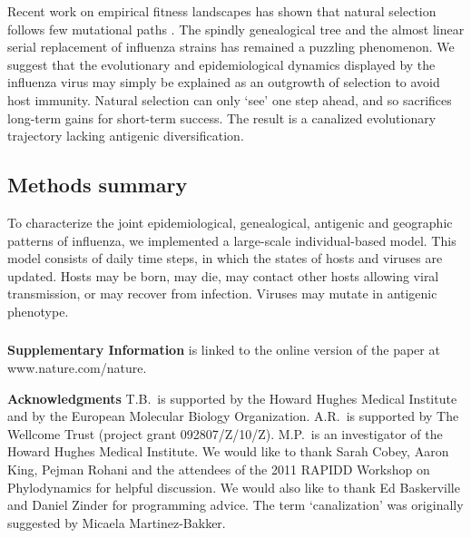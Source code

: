 Recent work on empirical fitness landscapes has shown that natural selection follows few mutational paths \cite{Weinreich06}.  The spindly genealogical tree and the almost linear serial replacement of influenza strains has remained a puzzling phenomenon.  We suggest that the evolutionary and epidemiological dynamics displayed by the influenza virus may simply be explained as an outgrowth of selection to avoid host immunity.  Natural selection can only `see' one step ahead, and so sacrifices long-term gains for short-term success.  The result is a canalized evolutionary trajectory lacking antigenic diversification.


\subsection*{Methods summary}

To characterize the joint epidemiological, genealogical, antigenic and geographic patterns of influenza, we implemented a large-scale individual-based model.  This model consists of daily time steps, in which the states of hosts and viruses are updated.  Hosts may be born, may die, may contact other hosts allowing viral transmission, or may recover from infection.  Viruses may mutate in antigenic phenotype.




\subsubsection*{}
\noindent \textbf{Supplementary Information} is linked to the online version of the paper at www.nature.com/nature.

\vspace{0.3cm}

\noindent \textbf{Acknowledgments} T.B.\ is supported by the Howard Hughes Medical Institute and by the European Molecular Biology Organization.  A.R.\ is supported by The Wellcome Trust (project grant 092807/Z/10/Z).  M.P.\ is an investigator of the Howard Hughes Medical Institute.  We would like to thank Sarah Cobey, Aaron King, Pejman Rohani and the attendees of the 2011 RAPIDD Workshop on Phylodynamics for helpful discussion.  We would also like to thank Ed Baskerville and Daniel Zinder for programming advice.  The term `canalization' was originally suggested by Micaela Martinez-Bakker. 

